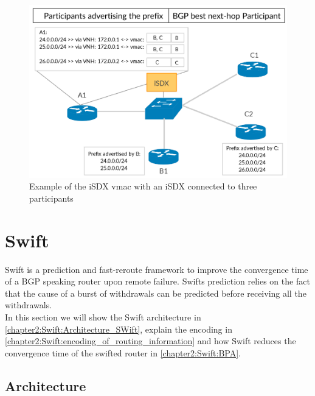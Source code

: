 \begin{figure}[h]
\center
\includegraphics[scale = 0.36]{Figures/bckgrnd_sdx_vmac_cropped.pdf}
\caption{Example of the iSDX vmac with an iSDX connected to three participants}
\label{fig:isdx_vmac}
\end{figure}

\section{\label{chapter2:Swift}Swift}

Swift is a prediction and fast-reroute framework to improve the convergence time of a BGP speaking router upon remote failure. Swifts prediction relies on the fact that the cause of a burst of withdrawals can be predicted before receiving all the withdrawals. \\
In this section we will show the Swift architecture in \ref{chapter2:Swift:Architecture_SWift}, explain the encoding in \ref{chapter2:Swift:encoding_of_routing_information} and how Swift reduces the convergence time of the swifted router in \ref{chapter2:Swift:BPA}.

\subsection{\label{chapter2:Swift:Architecture_SWift}Architecture}

